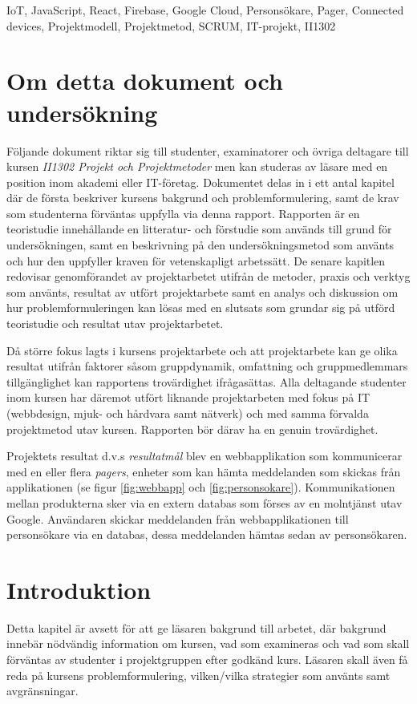 \documentclass[conference]{IEEEtran}
\begin{document}
\begin{IEEEkeywords}
IoT, JavaScript, React, Firebase, Google Cloud, Personsökare, Pager, Connected devices, Projektmodell, Projektmetod, SCRUM, IT-projekt, II1302
\end{IEEEkeywords}

\section{Om detta dokument och undersökning}
Följande dokument riktar sig till studenter, examinatorer och övriga deltagare till kursen \textit{II1302 Projekt och Projektmetoder} men kan studeras av läsare med en position inom akademi 
eller IT-företag. Dokumentet delas in i ett antal kapitel där de första beskriver kursens bakgrund och problemformulering, samt de krav som studenterna förväntas uppfylla via denna rapport.
Rapporten är en teoristudie innehållande en litteratur- och förstudie som används till grund för undersökningen, samt en beskrivning på den undersökningsmetod som använts och hur den 
uppfyller kraven för vetenskapligt arbetssätt. De senare kapitlen redovisar genomförandet av projektarbetet utifrån de metoder, praxis och 
verktyg som använts, resultat av utfört projektarbete samt en analys och diskussion om hur problemformuleringen kan lösas med en slutsats som grundar sig på utförd teoristudie och resultat utav projektarbetet.

Då större fokus lagts i kursens projektarbete och att projektarbete kan ge olika resultat utifrån faktorer såsom gruppdynamik, omfattning 
och gruppmedlemmars tillgänglighet kan rapportens trovärdighet ifrågasättas. Alla deltagande studenter inom kursen har däremot utfört liknande 
projektarbeten med fokus på IT (webbdesign, mjuk- och hårdvara samt nätverk) och med samma förvalda projektmetod utav kursen. Rapporten bör därav ha en genuin trovärdighet.

Projektets resultat d.v.s \textit{resultatmål} blev en webbapplikation som kommunicerar med en eller flera \textit{pagers}, enheter 
som kan hämta meddelanden som skickas från applikationen (se figur \ref{fig:webbapp} och \ref{fig:personsokare}). Kommunikationen mellan produkterna sker via en extern databas
som förses av en molntjänst utav Google. Användaren skickar meddelanden från webbapplikationen till personsökare via en databas, dessa meddelanden hämtas sedan av personsökaren.\\

\section{Introduktion}
Detta kapitel är avsett för att ge läsaren bakgrund till arbetet, där bakgrund innebär nödvändig information om kursen, 
vad som examineras och vad som skall förväntas av studenter i projektgruppen efter godkänd kurs.
Läsaren skall även få reda på kursens problemformulering, vilken/vilka strategier som använts samt avgränsningar.
\end{document}
